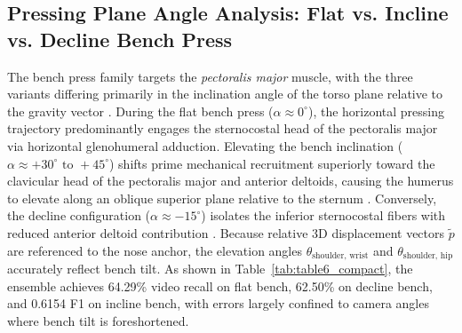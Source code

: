 \documentclass[preprint,12pt]{elsarticle}
\begin{document}
\subsection{Pressing Plane Angle Analysis: Flat vs. Incline vs. Decline Bench Press}
The bench press family targets the \textit{pectoralis major} muscle, with the three variants differing primarily in the inclination angle of the torso plane relative to the gravity vector \cite{barnett1995,trebs2010}. During the flat bench press ($\alpha \approx 0^\circ$), the horizontal pressing trajectory predominantly engages the sternocostal head of the pectoralis major via horizontal glenohumeral adduction. Elevating the bench inclination ($\alpha \approx +30^\circ \text{ to } +45^\circ$) shifts prime mechanical recruitment superiorly toward the clavicular head of the pectoralis major and anterior deltoids, causing the humerus to elevate along an oblique superior plane relative to the sternum \cite{trebs2010}. Conversely, the decline configuration ($\alpha \approx -15^\circ$) isolates the inferior sternocostal fibers with reduced anterior deltoid contribution \cite{barnett1995}. Because relative 3D displacement vectors $\tilde{p}$ are referenced to the nose anchor, the elevation angles $\theta_{\text{shoulder, wrist}}$ and $\theta_{\text{shoulder, hip}}$ accurately reflect bench tilt. As shown in Table~\ref{tab:table6_compact}, the ensemble achieves 64.29\% video recall on flat bench, 62.50\% on decline bench, and 0.6154 F1 on incline bench, with errors largely confined to camera angles where bench tilt is foreshortened.
\end{document}
